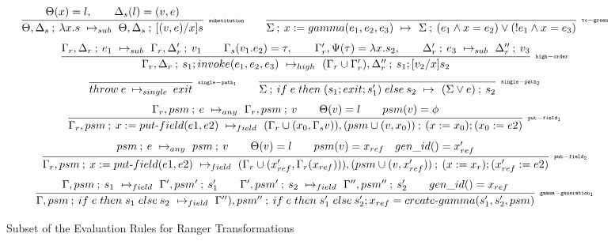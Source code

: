 \begin{figure*}[t]
{{$$
\infer[\rn{substitution}]
 {\step{\Theta, \Delta_s}{\lambda x.s}{\Theta, \Delta_s}{\sub{(v,e)}{x}{s}}{sub}}
 {\lookup{\Theta}{x} = l , \qquad \lookup{\Delta_s}{l}=(v,e)}
\qquad
\infer[\rn{to-green}]
 {\step{\Sigma}{x := gamma(e_1, e_2, e_3)}{\Sigma}{( e_1 \wedge x = e_2) \vee ( !e_1 \wedge x = e_3)}{}}
 {}
$$
$$
\infer[\rn{high-order}]
 {\step{\Gamma_r, \Delta_r}{s_1; invoke(e_1, e_2, e_3)}{(\Gamma_r \cup \Gamma_r'), \Delta_r''}{s_1; \sub{v_2}{x}{s_2}}{high}}
 {\step{\Gamma_r, \Delta_r}{e_1}{\Gamma_r, \Delta_r'}{v_1}{sub} \qquad \lookup{\Gamma_s}{v_1.e_2} = \tau , \qquad \Gamma_r', \lookup{\Psi}{\tau}=\lambda x.s_2, \qquad \step{\Delta_r'}{e_3}{\Delta_r''}{v_3}{sub}}
$$
$$
 \infer[\rn{single-path_1}]
 {\sstep{throw \:e}{single}{exit}}
 {}
\qquad
\infer[\rn{single-path_2}]
 {\step{\Sigma}{\ifr{e}{(s_1 ; exit ; s_1' )}{s_2}}{(\Sigma \vee e)}{s_2}{}}
 {}
$$
$$
\infer[\rn{put-field_1}]
 {\step{\Gamma_r, psm}{x := put\text{-}field(e1, e2)}{(\Gamma_r \cup (x_0, \Gamma_s{v})), (psm\cup(v, x_0))}{ (x := x_0); (x_0 := e2)}{field}}
 {\step{\Gamma_r, psm}{e}{\Gamma_r, psm}{v}{any} \qquad \Theta(v) = l \qquad psm(v) = \phi }
$$
$$
\infer[\rn{put-field_2}]
 {\step{\Gamma_r, psm}{x := put\text{-}field(e1, e2)}{(\Gamma_r \cup (x_{ref}', \Gamma_r(x_{ref}))), (psm\cup(v, x_{ref}'))}{ (x := x_r) ; (x_{ref}' := e2)}{field}}
 {\step{psm}{e}{psm}{v}{any} \qquad \Theta(v) = l \qquad psm(v) = x_{ref} \quad gen\_id() = x_{ref}'}
$$
$$
\infer[\rn{gamma-generation_1}]
 {\step{\Gamma, psm}{\ifr{e}{s_1}{s_2}}{\Gamma''), psm''}{\ifr{e}{s_1'}{s_2'} ; x_{ref} = create\text{-}gamma(s_1', s_2', psm)}{field}}
 {\step{\Gamma, psm}{s_1}{\Gamma', psm'}{s_1'}{field} \qquad 
 \step{\Gamma', psm'}{s_2}{\Gamma'', psm''}{s_2'}{field}  \qquad gen\_id() = x_{ref}}
$$
}}
\caption{Subset of the Evaluation Rules for Ranger Transformations}
\label{fig:semantics}
\end{figure*}
%
